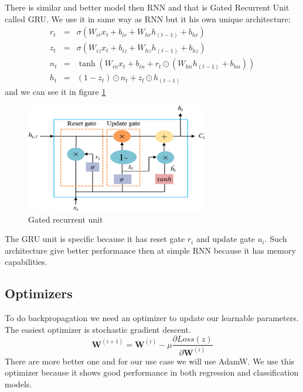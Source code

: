 There is similar and better model then RNN and that is Gated Recurrent Unit called GRU.
We use it in same way as RNN but it his own unique architecture\cite{gru}:
\begin{eqnarray}
	r_t &=& \sigma(W_{ir} x_t + b_{ir} + W_{hr} h_{(t-1)} + b_{hr}) \\
	z_t &=& \sigma(W_{iz} x_t + b_{iz} + W_{hz} h_{(t-1)} + b_{hz}) \\
	n_t &=& \tanh(W_{in} x_t + b_{in} + r_t \odot (W_{hn} h_{(t-1)}+ b_{hn})) \\
	h_t &=& (1 - z_t) \odot n_t + z_t \odot h_{(t-1)}
\end{eqnarray} and we can see it in figure \ref{gru}
\begin{figure}[h!]
	\centering\includegraphics[width=8cm]{chapters/chapter2/gru}
	\caption{Gated recurrent unit\cite{gru_picture}}
	\label{gru}
\end{figure}
The GRU unit is specific because it has reset gate $r_i$ and update gate $u_i$. Such architecture give better performance then at simple RNN because it has memory capabilities.



\subsection{Optimizers}
To do backpropagation we need an optimizer to update our learnable parameters. The easiest optimizer is stochastic gradient descent.
\begin{equation}
	\mathbf{W}^{(i+1)} =\mathbf{W}^{(i)}-\mu \frac{\partial Loss(z)}{\partial \mathbf{W}^{(i)}}
\end{equation}
There are more better one and for our use case we will use AdamW\cite{adamW}.
We use this optimizer because it shows good performance in both regression and classification models.
 

